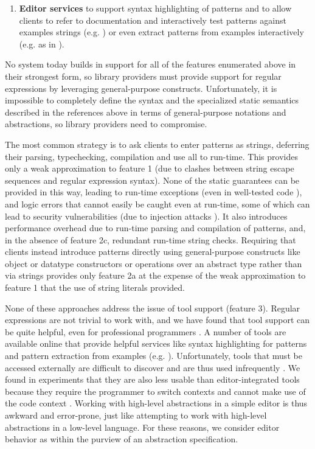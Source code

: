 \begin{enumerate}
\item \textbf{Editor services} to support syntax highlighting of patterns and to allow clients to refer to documentation and interactively test patterns against examples strings (e.g. \cite{IntelliJRegexp}) or even extract patterns from examples interactively (e.g. as in \cite{_txt2re:_????}).
\end{enumerate}

No system today builds in support for all of the features enumerated above in their strongest form, so library providers must provide support for regular expressions by leveraging  general-purpose constructs. Unfortunately, it is impossible to completely define the syntax and the specialized static semantics described in the references above in terms of general-purpose notations and abstractions, so library providers need to compromise. 

The most common strategy is to ask clients to enter patterns as strings, deferring their parsing, typechecking, compilation and use all to run-time. This provides only a weak approximation to feature 1 (due to clashes between string escape sequences and regular expression syntax). None of the static guarantees can be provided in this way, leading to run-time exceptions (even in well-tested code \cite{spishak2012type}), and logic errors that cannot easily be caught even at run-time, some of which can lead to security vulnerabilities (due to injection attacks \cite{owasp2013}). It also introduces performance overhead due to run-time parsing and compilation of patterns, and, in the absence of feature 2c,   redundant run-time string checks. 
Requiring that clients instead introduce patterns directly using general-purpose constructs like object or datatype constructors or operations over an abstract type rather than via strings provides only feature 2a at the expense of the weak approximation to feature 1 that the use of string literals provided. 

None of these approaches address the issue of tool support (feature 3). Regular expressions are not trivial to work with, and we have found that tool support can be quite helpful, even for professional programmers \cite{Omar:2012:ACC:2337223.2337324}. A number of tools are available online that provide helpful services like syntax highlighting for patterns and pattern extraction from examples (e.g. \cite{_txt2re:_????}). Unfortunately, tools that must be accessed externally are difficult to discover and are thus used infrequently \cite{Murphy-Hill:2011:PIE:1958824.1958888,Campbell:2008:DRT:1636642.1636651,Omar:2012:ACC:2337223.2337324}. We found in experiments that they are also less usable than editor-integrated tools %
because they require the programmer to switch contexts  and cannot make use of the code context \cite{Omar:2012:ACC:2337223.2337324}. Working with high-level abstractions in a simple editor is thus awkward and error-prone, just like attempting to work with high-level abstractions in a low-level language. For these reasons,   we consider editor behavior as within the purview of an abstraction specification.
